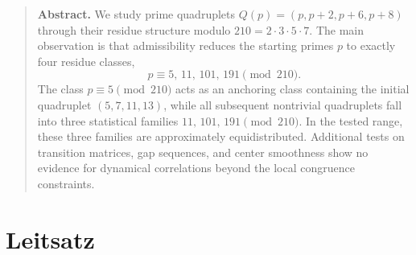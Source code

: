 \documentclass[11pt,a4paper]{article}
\begin{document}
\begin{quote}
\textbf{Abstract.}
We study prime quadruplets $Q(p) = (p, p+2, p+6, p+8)$ through their residue structure modulo $210 = 2\cdot 3\cdot 5\cdot 7$. The main observation is that admissibility reduces the starting primes $p$ to exactly four residue classes,
\[
  p \equiv 5,\, 11,\, 101,\, 191 \pmod{210}.
\]
The class $p \equiv 5 \pmod{210}$ acts as an anchoring class containing the initial quadruplet $(5,7,11,13)$, while all subsequent nontrivial quadruplets fall into three statistical families $11,\, 101,\, 191 \pmod{210}$. In the tested range, these three families are approximately equidistributed. Additional tests on transition matrices, gap sequences, and center smoothness show no evidence for dynamical correlations beyond the local congruence constraints.
\end{quote}

\section{Leitsatz}

\begin{center}
\end{center}
\end{document}
